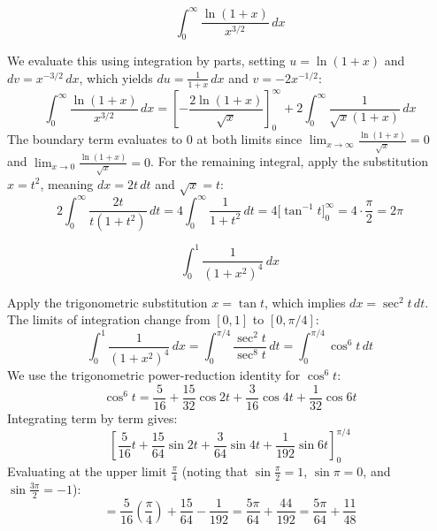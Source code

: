 \begin{questions}
\question
\[ \int_{0}^{\infty} \frac{\ln(1 + x)}{x^{3/2}} \,dx \]
\begin{solution}
We evaluate this using integration by parts, setting $u = \ln(1 + x)$ and $dv = x^{-3/2} \,dx$, which yields $du = \frac{1}{1 + x} \,dx$ and $v = -2x^{-1/2}$:
\[ \int_{0}^{\infty} \frac{\ln(1 + x)}{x^{3/2}} \,dx = \left[ -\frac{2\ln(1 + x)}{\sqrt{x}} \right]_{0}^{\infty} + 2 \int_{0}^{\infty} \frac{1}{\sqrt{x}(1 + x)} \,dx \]
The boundary term evaluates to $0$ at both limits since $\lim_{x\to\infty} \frac{\ln(1+x)}{\sqrt{x}} = 0$ and $\lim_{x\to0} \frac{\ln(1+x)}{\sqrt{x}} = 0$.
For the remaining integral, apply the substitution $x = t^2$, meaning $dx = 2t \,dt$ and $\sqrt{x} = t$:
\[ 2 \int_{0}^{\infty} \frac{2t}{t(1 + t^2)} \,dt = 4 \int_{0}^{\infty} \frac{1}{1 + t^2} \,dt = 4 \Big[ \tan^{-1} t \Big]_{0}^{\infty} = 4 \cdot \frac{\pi}{2} = 2\pi \]
\end{solution}

\question
\[ \int_{0}^{1} \frac{1}{(1 + x^2)^4} \,dx \]
\begin{solution}
Apply the trigonometric substitution $x = \tan t$, which implies $dx = \sec^2 t \,dt$. The limits of integration change from $[0, 1]$ to $[0, \pi/4]$:
\[ \int_{0}^{1} \frac{1}{(1 + x^2)^4} \,dx = \int_{0}^{\pi/4} \frac{\sec^2 t}{\sec^8 t} \,dt = \int_{0}^{\pi/4} \cos^6 t \,dt \]
We use the trigonometric power-reduction identity for $\cos^6 t$:
\[ \cos^6 t = \frac{5}{16} + \frac{15}{32} \cos 2t + \frac{3}{16} \cos 4t + \frac{1}{32} \cos 6t \]
Integrating term by term gives:
\[ \left[ \frac{5}{16}t + \frac{15}{64} \sin 2t + \frac{3}{64} \sin 4t + \frac{1}{192} \sin 6t \right]_{0}^{\pi/4} \]
Evaluating at the upper limit $\frac{\pi}{4}$ (noting that $\sin \frac{\pi}{2} = 1$, $\sin \pi = 0$, and $\sin \frac{3\pi}{2} = -1$):
\[ = \frac{5}{16}\left(\frac{\pi}{4}\right) + \frac{15}{64} - \frac{1}{192} = \frac{5\pi}{64} + \frac{44}{192} = \frac{5\pi}{64} + \frac{11}{48} \]
\end{solution}


\end{questions}
